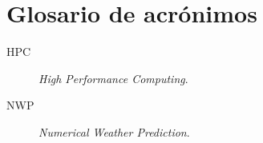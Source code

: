 \chapter{Glosario de acrónimos}
\label{chap:acronimos}


\begin{description}
	\item [HPC] \emph{High Performance Computing}.
	\item [NWP] \emph{Numerical Weather Prediction}.
\end{description}

